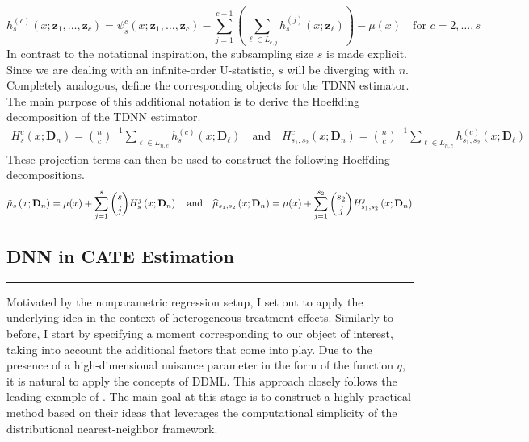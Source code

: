 \begin{equation}
	h_{s}^{(c)}\left(x; \mathbf{z}_{1}, \dotsc, \mathbf{z}_{c}\right)
	= \psi_{s}^{c}(x; \mathbf{z}_{1}, \dotsc, \mathbf{z}_{c}) - \sum_{j = 1}^{c-1}\left(\sum_{\ell \in L_{c,j}}h_{s}^{(j)}(x; \mathbf{z}_{\ell})\right) - \mu(x)
	\quad \text{for } c = 2, \dotsc, s
\end{equation}
In contrast to the notational inspiration, the subsampling size $s$ is made explicit.
Since we are dealing with an infinite-order U-statistic, $s$ will be diverging with $n$.
Completely analogous, define the corresponding objects for the TDNN estimator.
The main purpose of this additional notation is to derive the Hoeffding decomposition of the TDNN estimator.
\begin{equation}\label{eq:H_projection}
	\begin{aligned}
		H_{s}^{c}\left(x; \mathbf{D}_n\right)
		= \binom{n}{c}^{-1} \sum_{\ell \in L_{n,c}} h^{(c)}_{s}(x; \mathbf{D}_{\ell})
		\quad \text{and} \quad
		H_{s_1, s_2}^{c}\left(x; \mathbf{D}_n\right)
		= \binom{n}{c}^{-1} \sum_{\ell \in L_{n,c}} h^{(c)}_{s_1, s_2}(x; \mathbf{D}_{\ell})
	\end{aligned}
\end{equation}
These projection terms can then be used to construct the following Hoeffding decompositions.
\begin{equation}\label{eq:H_Decomp}
	\tilde{\mu}_{s}\left(x; \mathbf{D}_n\right)
	= \mu(x) + \sum_{j = 1}^{s}\binom{s}{j}H_{s}^{j}\left(x; \mathbf{D}_n\right)\\
	\quad \text{and} \quad
	\hat{\mu}_{s_1, s_2}\left(x; \mathbf{D}_n\right)
	= \mu(x) + \sum_{j = 1}^{s_2}\binom{s_2}{j}H_{s_1, s_2}^{j}\left(x; \mathbf{D}_n\right)
\end{equation}

\subsection{DNN in CATE Estimation}
\hrule
Motivated by the nonparametric regression setup, I set out to apply the underlying idea in the context of heterogeneous treatment effects.
Similarly to before, I start by specifying a moment corresponding to our object of interest, taking into account the additional factors that come into play.
Due to the presence of a high-dimensional nuisance parameter in the form of the function $q$, it is natural to apply the concepts of DDML.
This approach closely follows the leading example of \citet{ritzwoller_simultaneous_2024}.
The main goal at this stage is to construct a highly practical method based on their ideas that leverages the computational simplicity of the distributional nearest-neighbor framework.\\

